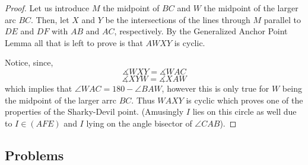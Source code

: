 \documentclass{article}
\begin{document}
\begin{proof}
  Let us introduce \(M\) the midpoint of \(BC\) and \(W\) the midpoint of the larger arc \(BC\). Then, let \(X\) and \(Y\) be the intersections of the lines through \(M\) parallel to \(DE\) and \(DF\) with \(AB\) and \(AC\), respectively. By the Generalized Anchor Point Lemma all that is left to prove is that \(AWXY\) is cyclic.

  Notice, since,
  \[\measuredangle WXY = \measuredangle WAC\]
  \[\measuredangle XYW = \measuredangle XAW\]
  which implies that \(\angle{WAC} = 180 - \angle{BAW}\), however this is only true for \(W\) being the midpoint of the larger arrc \(BC\). Thus \(WAXY\) is cyclic which proves one of the properties of the Sharky-Devil point. (Amusingly \(I\) lies on this circle as well due to \(I \in (AFE)\) and \(I\) lying on the angle bisector of \(\angle{CAB}\)).
\end{proof}

\subsection{Problems}
\end{document}
